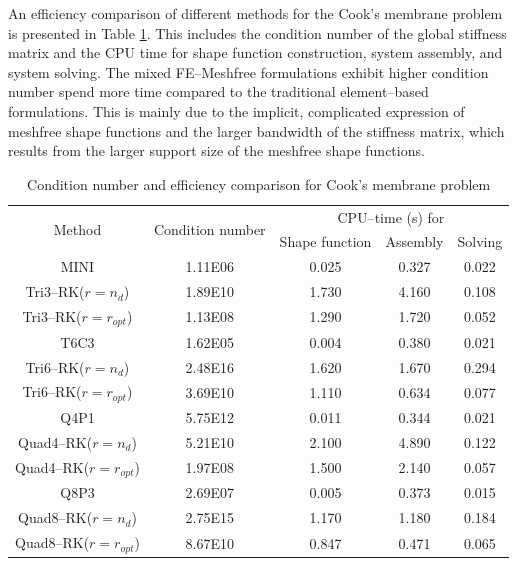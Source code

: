 An efficiency comparison of different methods for the Cook's membrane problem is presented in Table \ref{tab_condition}.
This includes the condition number of the global stiffness matrix and the CPU time for shape function construction, system assembly, and system solving.
The mixed FE--Meshfree formulations exhibit higher condition number spend more time compared to the traditional element--based formulations.
This is mainly due to the implicit, complicated expression of meshfree shape functions and the larger bandwidth of the stiffness matrix, which results from the larger support size of the meshfree shape functions.

\begin{table}[!htp]
\centering
\caption{Condition number and efficiency comparison for Cook's membrane problem}
\label{tab_condition}
\begin{tabular}{ccccc}
\toprule
\multirow{2}{*}{Method} & \multirow{2}{*}{Condition number} & \multicolumn{3}{c}{CPU--time (s) for} \\
\shortstack{} & \shortstack{} & Shape function & Assembly & Solving \\
\midrule
MINI & 1.11E06 & 0.025 & 0.327 & 0.022 \\
Tri3--RK($r=n_d$) & 1.89E10 & 1.730 & 4.160 & 0.108 \\
Tri3--RK($r=r_{opt}$) & 1.13E08 & 1.290 & 1.720 & 0.052 \\
T6C3 & 1.62E05 & 0.004 & 0.380 & 0.021 \\
Tri6--RK($r=n_d$) & 2.48E16 & 1.620 & 1.670 & 0.294 \\
Tri6--RK($r=r_{opt}$) & 3.69E10 & 1.110 & 0.634 & 0.077 \\
Q4P1 & 5.75E12 & 0.011 & 0.344 & 0.021 \\
Quad4--RK($r=n_d$) & 5.21E10 & 2.100 & 4.890 & 0.122 \\
Quad4--RK($r=r_{opt}$) & 1.97E08 & 1.500 & 2.140 & 0.057 \\
Q8P3 & 2.69E07 & 0.005 & 0.373 & 0.015 \\
Quad8--RK($r=n_d$) & 2.75E15 & 1.170 & 1.180 & 0.184 \\
Quad8--RK($r=r_{opt}$) & 8.67E10 & 0.847 & 0.471 & 0.065 \\
\bottomrule
\end{tabular}
\end{table}
